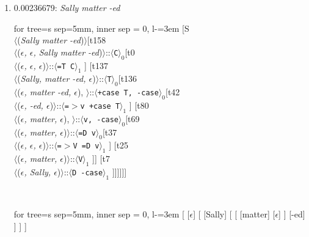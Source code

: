 \documentclass[11pt]{article}
\begin{document}
\begin{enumerate}
	\item  0.00236679: \textit{Sally matter -ed} \\[0.5em]
	\begin{adjustbox}{max width = \textwidth}
	\begin{forest}
	for tree={s sep=5mm, inner sep = 0, l-=3em}
	[S\\$\langle$(\textit{Sally matter -ed})$\rangle$[t158\\$\langle$(\textit{$\epsilon${,} $\epsilon${,} Sally matter -ed})$\rangle$::$\langle$\texttt{C}$\rangle_0$[t0\\$\langle$(\textit{$\epsilon${,} $\epsilon${,} $\epsilon$})$\rangle$::$\langle$\texttt{{=}T C}$\rangle_1$ ] [t137\\$\langle$(\textit{Sally{,} matter -ed{,} $\epsilon$})$\rangle$::$\langle$\texttt{T}$\rangle_0$[t136\\$\langle$(\textit{$\epsilon${,} matter -ed{,} $\epsilon$}){,} $\rangle$::$\langle$\texttt{+case T{,} -case}$\rangle_0$[t42\\$\langle$(\textit{$\epsilon${,} -ed{,} $\epsilon$})$\rangle$::$\langle$\texttt{{=}$>$v +case T}$\rangle_1$ ] [t80\\$\langle$(\textit{$\epsilon${,} matter{,} $\epsilon$}){,} $\rangle$::$\langle$\texttt{v{,} -case}$\rangle_0$[t69\\$\langle$(\textit{$\epsilon${,} matter{,} $\epsilon$})$\rangle$::$\langle$\texttt{{=}D v}$\rangle_0$[t37\\$\langle$(\textit{$\epsilon${,} $\epsilon${,} $\epsilon$})$\rangle$::$\langle$\texttt{{=}$>$V {=}D v}$\rangle_1$ ] [t25\\$\langle$(\textit{$\epsilon${,} matter{,} $\epsilon$})$\rangle$::$\langle$\texttt{V}$\rangle_1$ ]] [t7\\$\langle$(\textit{$\epsilon${,} Sally{,} $\epsilon$})$\rangle$::$\langle$\texttt{D -case}$\rangle_1$ ]]]]]]
	\end{forest}
	\end{adjustbox}
	\\
	\begin{adjustbox}{max width = \textwidth}
	\begin{forest}
	for tree={s sep=5mm, inner sep = 0, l-=3em}
	[ [$\epsilon$] [ [Sally] [ [ [matter] [$\epsilon$] ] [-ed] ] ] ]
	\end{forest}
	\end{adjustbox}
	\newpage


\end{enumerate}
\end{document}
